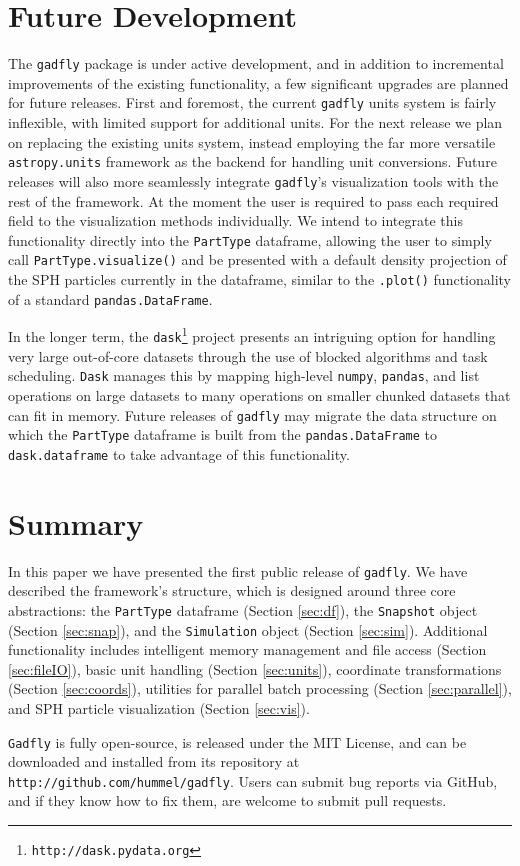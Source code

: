 \documentclass{emulateapj}
\newcommand{\code}[1]{\texttt{#1}}
\begin{document}
\section{Future Development}
\label{sec:future}
The \code{gadfly} package is under active development, and in addition to incremental improvements of the existing functionality, a few significant upgrades are planned for future releases.  
First and foremost, the current \code{gadfly} units system is fairly inflexible, with limited support for additional units.  
For the next release we plan on replacing the existing units system, instead employing the far more versatile \code{astropy.units} framework \citep{Robitailleetal2013} as the backend for handling unit conversions. 
Future releases will also more seamlessly integrate \code{gadfly}'s visualization tools with the rest of the framework.  
At the moment the user is required to pass each required field to the visualization methods individually.
We intend to integrate this functionality directly into the \code{PartType} dataframe, allowing the user to simply call \code{PartType.visualize()} and be presented with a default density projection of the SPH particles currently in the dataframe, similar to the \code{.plot()} functionality of a standard \code{pandas.DataFrame}.

In the longer term, the \code{dask}\footnote{\code{http://dask.pydata.org}} project presents an intriguing option for handling very large out-of-core datasets through the use of blocked algorithms and task scheduling.
\code{Dask} manages this by mapping high-level \code{numpy}, \code{pandas}, and list operations on large datasets to many operations on smaller chunked datasets that can fit in memory.  
Future releases of \code{gadfly} may migrate the data structure on which the \code{PartType} dataframe is built from the \code{pandas.DataFrame} to \code{dask.dataframe} to take advantage of this functionality.

\section{Summary}
\label{sec:summary}
In this paper we have presented the first public release of \code{gadfly}.  We have described the framework's structure, which is designed around three core abstractions: the \code{PartType} dataframe (Section \ref{sec:df}), the \code{Snapshot} object (Section \ref{sec:snap}), and the \code{Simulation} object (Section \ref{sec:sim}).  Additional functionality includes intelligent memory management and file access (Section \ref{sec:fileIO}), basic unit handling (Section \ref{sec:units}), coordinate transformations (Section \ref{sec:coords}), utilities for parallel batch processing (Section \ref{sec:parallel}), and SPH particle visualization (Section \ref{sec:vis}).

\code{Gadfly} is fully open-source, is released under the MIT License, and can be downloaded and installed from its repository at \code{http://github.com/hummel/gadfly}.  Users can submit bug reports via GitHub, and if they know how to fix them, are welcome to submit pull requests.




\end{document}
